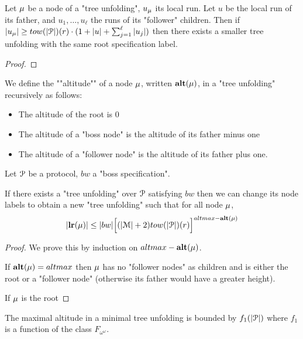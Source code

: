 \begin{lemma}
	Let $\mu$ be a node of a "tree unfolding", $u_\mu$ its local run.
	Let $u$ be the local run of its father, and $u_1, \ldots, u_\ell$ the runs of its "follower" children.
	Then if $\size{u_\node} \geq \towerfun(\size{\prot})(r) \cdot (1+ \size{u}+ \sum_{j=1}^{\ell} \size{u_j})$ then there exists a smaller tree unfolding with the same root specification label.
\end{lemma}

\ifproofs
\begin{proof}
\end{proof}
\fi

\begin{definition}
	We define the ""altitude"" of a node $\mu$, written $\mathbf{alt(\mu)}$, in a "tree unfolding" recursively as follows:
	\begin{itemize}
		\item The altitude of the root is $0$
		
		\item The altitude of a "boss node" is the altitude of its father minus one
		
		\item The altitude of a "follower node" is the altitude of its father plus one.
	\end{itemize}
\end{definition}

\begin{lemma}
	\label{lem:bound-length-at-height-h}
	Let $\mathcal{P}$ be a protocol, $bw$ a "boss specification".
	 
	If there exists a "tree unfolding" over $\mathcal{P}$ satisfying $bw$ then we can change its node labels to obtain a new "tree unfolding" such that for all node $\mu$, 
	\[
		\size{\localrunlabel{\node}} \leq \size{bw} \Big[(\size{\messages}+2) \towerfun(\size{\prot})(r)\Big]^{altmax-\altitude{\node}}
	\] 
\end{lemma}

\ifproofs
\begin{proof}
	We prove this by induction on $altmax-\mathbf{alt(\mu)}$.
	
	If $\mathbf{alt(\mu)} = altmax$ then $\mu$ has no "follower nodes" as children and is either the root or a "follower node" (otherwise its father would have a greater height).
	
	If $\mu$ is the root 
\end{proof}
\fi

\begin{lemma}
	\label{lem:bound-max-height}
	The maximal altitude in a minimal tree unfolding is bounded by $f_1(|\mathcal{P}|)$ where $f_1$ is a function of the class $F_{\omega^\omega}$.
\end{lemma}

